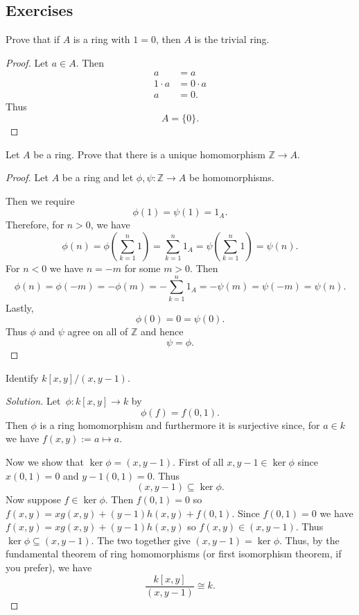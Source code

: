 \subsection*{Exercises}

\begin{prob}
    Prove that if $A$ is a ring with $1 = 0$, then 
    $A$ is the trivial ring. 
\end{prob}
\begin{proof}
    Let $a \in A$. Then 
    \begin{align*}
        a &= a \\ 
        1 \cdot a &= 0 \cdot a \\ 
        a &= 0. 
    \end{align*}
    Thus 
    \[
        A = \{0\}.
    \]
\end{proof}

\begin{prob}
    Let $A$ be a ring. Prove that there is a unique 
    homomorphism $\mathbb Z \to A$. 
\end{prob}
\begin{proof}
    Let $A$ be a ring and 
    let $\phi, \psi : \mathbb Z \to A$ be homomorphisms. 

    Then we require 
    \[
        \phi(1) = \psi(1) = 1_A. 
    \]
    Therefore, for $n > 0$, we have 
    \[
        \phi(n) = \phi\left(\sum_{k=1}^n 1\right) 
        = \sum_{k=1}^n 1_A 
        = \psi\left(\sum_{k=1}^n 1\right) 
        = \psi(n). 
    \]
    For $n < 0$ we have $n = -m$ for some 
    $m > 0$. Then 
    \[
        \phi(n) = \phi(-m) = -\phi(m) 
        = - \sum_{k=1}^n 1_A 
        = -\psi(m) = \psi(-m) = \psi(n).
    \]
    Lastly, 
    \[
        \phi(0) = 0 = \psi(0). 
    \]
    Thus $\phi$ and $\psi$ agree on all 
    of $\mathbb Z$ and hence 
    \[
        \psi = \phi. 
    \]
\end{proof}

\begin{prob}
    Identify $k[x,y] / (x,y-1)$. 
\end{prob}
\begin{proof}[Solution]
    Let $\phi : k[x,y] \to k$ by 
    \[
        \phi(f) = f(0,1). 
    \]
    Then $\phi$ is a ring homomorphism and 
    furthermore it is surjective since, for 
    $a \in k$ we have $f(x,y) := a \mapsto a$. 

    Now we show that 
    $\ker \phi = (x,y-1)$. First of all 
    $x, y-1 \in \ker \phi$ since $x(0,1) = 0$ and 
    $y-1(0,1) = 0$. Thus 
    \[
        (x,y-1) \subseteq \ker \phi.
    \]
    Now suppose $f \in \ker \phi$. Then 
    $f(0,1) = 0$ so $f(x,y) = xg(x,y) + (y-1)h(x,y) + 
    f(0,1)$. Since $f(0,1) = 0$ we have $f(x,y) = xg(x,y) + 
    (y-1)h(x,y)$ so $f(x,y) \in (x, y-1)$. Thus 
    $\ker \phi \subseteq (x,y-1)$. The two together give 
    $(x,y-1) = \ker \phi$. 
    Thus, by the fundamental theorem of ring homomorphisms 
    (or first isomorphism theorem, if you prefer), we have 
    \[
        \frac{k[x,y]}{(x,y-1)} \cong 
        k.
    \]
\end{proof}

